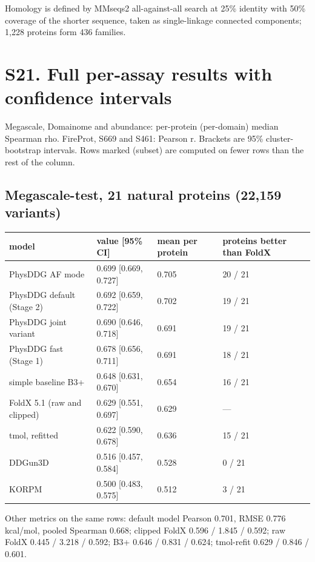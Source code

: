 \documentclass[11pt,a4paper]{article}
\begin{document}
Homology is defined by MMseqs2 all-against-all search at 25\% identity with 50\% coverage of the shorter sequence,
taken as single-linkage connected components; 1,228 proteins form 436 families.



\section{S21. Full per-assay results with confidence intervals}

Megascale, Domainome and abundance: per-protein (per-domain) median Spearman rho. FireProt, S669 and S461:
Pearson r. Brackets are 95\% cluster-bootstrap intervals. Rows marked (subset) are computed on fewer rows than
the rest of the column.

\subsection*{Megascale-test, 21 natural proteins (22,159 variants)}

\begin{center}\scriptsize
\begin{tabular}{@{}llll@{}}
\toprule
model & value [95\% CI] & mean per protein & proteins better than FoldX \\
\midrule
PhysDDG AF mode & 0.699 [0.669, 0.727] & 0.705 & 20 / 21 \\
PhysDDG default (Stage 2) & 0.692 [0.659, 0.722] & 0.702 & 19 / 21 \\
PhysDDG joint variant & 0.690 [0.646, 0.718] & 0.691 & 19 / 21 \\
PhysDDG fast (Stage 1) & 0.678 [0.656, 0.711] & 0.691 & 18 / 21 \\
simple baseline B3+ & 0.648 [0.631, 0.670] & 0.654 & 16 / 21 \\
FoldX 5.1 (raw and clipped) & 0.629 [0.551, 0.697] & 0.629 & --- \\
tmol, refitted & 0.622 [0.590, 0.678] & 0.636 & 15 / 21 \\
DDGun3D & 0.516 [0.457, 0.584] & 0.528 & 0 / 21 \\
KORPM & 0.500 [0.483, 0.575] & 0.512 & 3 / 21 \\
\bottomrule
\end{tabular}\end{center}

Other metrics on the same rows: default model Pearson 0.701, RMSE 0.776 kcal/mol, pooled Spearman 0.668;
clipped FoldX 0.596 / 1.845 / 0.592; raw FoldX 0.445 / 3.218 / 0.592; B3+ 0.646 / 0.831 / 0.624; tmol-refit
0.629 / 0.846 / 0.601.
\end{document}
